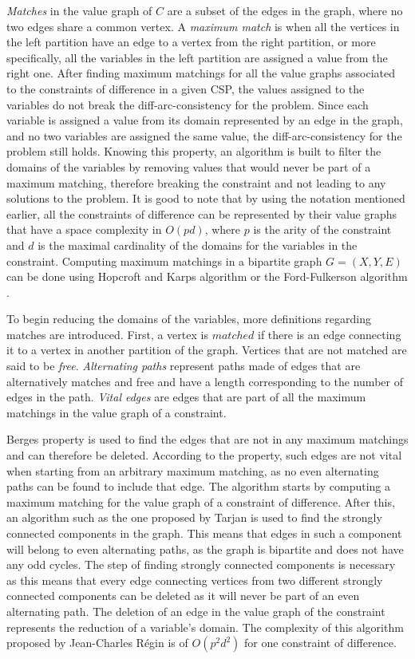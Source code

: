 \documentclass{l4proj}
\begin{document}
\noindent \textit{Matches} in the value graph of $C$ are a subset of the edges in the graph, where no two edges share a common vertex. A \textit{maximum match} is when all the vertices in the left partition have an edge to a vertex from the right partition, or more specifically, all the variables in the left partition are assigned a value from the right one.
After finding maximum matchings for all the value graphs associated to the constraints of difference in a given CSP, the values assigned to the variables do not break the diff-arc-consistency for the problem. Since each variable is assigned a value from its domain represented by an edge in the graph, and no two variables are assigned the same value, the diff-arc-consistency for the problem still holds. Knowing this property, an algorithm is built to filter the domains of the variables by removing values that would never be part of a maximum matching, therefore breaking the constraint and not leading to any solutions to the problem. It is good to note that by using the notation mentioned earlier, all the constraints of difference can be represented by their value graphs that have a space complexity in $O(pd)$, where $p$ is the arity of the constraint and $d$ is the maximal cardinality of the domains for the variables in the constraint. Computing maximum matchings in a bipartite graph $G = (X, Y, E)$ can be done using Hopcroft and Karp\textquotesingle s algorithm \cite{hopcroft1973n} or the Ford-Fulkerson algorithm \cite{ford1956maximal}. 

\noindent To begin reducing the domains of the variables, more definitions regarding matches are introduced. First, a vertex is $matched$ if there is an edge connecting it to a vertex in another partition of the graph. Vertices that are not matched are said to be \textit{free}. \textit{Alternating paths} represent paths made of edges that are alternatively matches and free and have a length corresponding to the number of edges in the path. \textit{Vital edges} are edges that are part of all the maximum matchings in the value graph of a constraint.

\noindent Berge\textquotesingle s property \cite{berge1957two} is used to find the edges that are not in any maximum matchings and can therefore be deleted. According to the property, such edges are not vital when starting from an arbitrary maximum matching, as no even alternating paths can be found to include that edge. The algorithm starts by computing a maximum matching for the value graph of a constraint of difference. After this, an algorithm such as the one proposed by Tarjan \cite{tarjan1972depth} is used to find the strongly connected components in the graph. This means that edges in such a component will belong to even alternating paths, as the graph is bipartite and does not have any odd cycles. The step of finding strongly connected components is necessary as this means that every edge connecting vertices from two different strongly connected components can be deleted as it will never be part of an even alternating path. The deletion of an edge in the value graph of the constraint represents the reduction of a variable's domain. The complexity of this algorithm proposed by Jean-Charles R\'egin \cite{regin1994filtering} is of $O(p^2d^2)$ for one constraint of difference.
\end{document}
